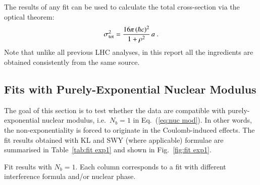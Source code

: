 The results of any fit can be used to calculate the total cross-section via the optical theorem:
\begin{equation}
\label{eq:si tot}
\sigma_{\rm tot}^2 = {16\pi\, (\hbar c)^2\over 1 + \rho^2}\, a\ .
\end{equation}
Note that unlike all previous LHC analyses, in this report all the ingredients are obtained consistently from the same source.


\subsection{Fits with Purely-Exponential Nuclear Modulus}
\label{sec:fit exp1}

The goal of this section is to test whether the data are compatible with purely-exponential nuclear modulus, i.e.~$N_b=1$ in Eq.~(\ref{eq:nuc mod}). In other words, the non-exponentiality is forced to originate in the Coulomb-induced effects. The fit results obtained with KL and SWY (where applicable) formulae are summarised in Table~\ref{tab:fit exp1} and shown in Fig.~\ref{fig:fit exp1}.

\begin{table}
\caption{Fit results with $N_b=1$. Each column corresponds to a fit with different interference formula and/or nuclear phase.}
\vskip-3mm
\label{tab:fit exp1}
\begin{center}
\setlength\tabcolsep{2.5mm}
\small

\end{center}
\end{table}


